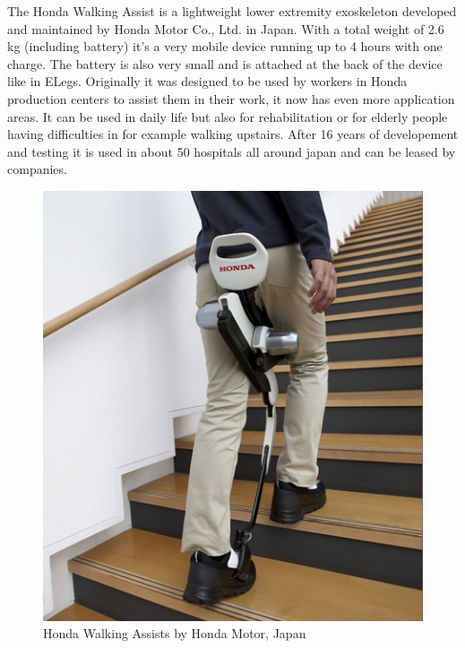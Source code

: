 \documentclass[letterpaper, 10 pt, conference]{ieeeconf}  %
\begin{document}

The Honda Walking Assist is a lightweight lower extremity exoskeleton developed and maintained by Honda Motor Co., Ltd. in Japan. With a total weight of 2.6 kg (including battery) it's a very mobile device running up to 4 hours with one charge. The battery is also very small and is attached at the back of the device like in ELegs. Originally it was designed to be used by workers in Honda production centers to assist them in their work, it now has even more application areas. It can be used in daily life but also for rehabilitation or for elderly people having difficulties in for example walking upstairs. After 16 years of developement and testing it is used in about 50 hospitals all around japan and can be leased by companies.


\begin{figure}[H]
  \centering
    \includegraphics[scale=0.5]{img/honda}
  \caption{Honda Walking Assists by Honda Motor, Japan}
\end{figure}
\newpage

\end{document}
